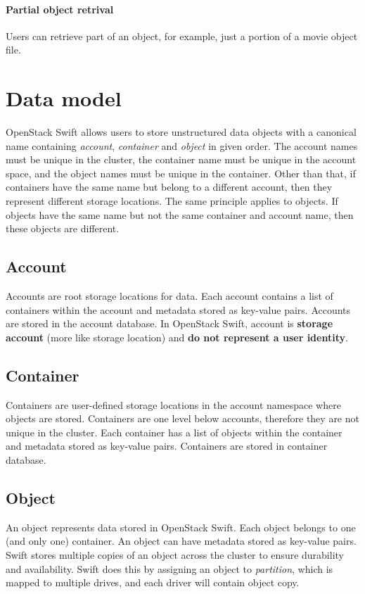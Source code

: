     \paragraph{Partial object retrival}
    Users can retrieve part of an object, for example, just a portion of a movie object file\cite{swiftImplementingCloudStorage}.

    \section{Data model}
    OpenStack Swift allows users to store unstructured data objects with a canonical name containing \textit{account}, \textit{container} and \textit{object} in given order\cite{swiftOpenStackSwift}. The account names must be unique in the cluster, the container name must be unique in the account space, and the object names must be unique in the container. Other than that, if containers have the same name but belong to a different account, then they represent different storage locations. The same principle applies to objects. If objects have the same name but not the same container and account name, then these objects are different.

    \subsection{Account}
    Accounts are root storage locations for data. Each account contains a list of containers within the account and metadata stored as key-value pairs. Accounts are stored in the account database. In OpenStack Swift, account is \textbf{storage account} (more like storage location) and \textbf{do not represent a user identity}\cite{swiftOpenStackSwift}.

    \subsection{Container}
    Containers are user-defined storage locations in the account namespace where objects are stored. Containers are one level below accounts, therefore they are not unique in the cluster. Each container has a list of objects within the container and metadata stored as key-value pairs. Containers are stored in container database\cite{swiftOpenStackSwift}.

    \subsection{Object}
    An object represents data stored in OpenStack Swift. Each object belongs to one (and only one) container. An object can have metadata stored as key-value pairs. Swift stores multiple copies of an object across the cluster to ensure durability and availability. Swift does this by assigning an object to \textit{partition}, which is mapped to multiple drives, and each driver will contain object copy\cite{swiftOpenStackSwift}.

